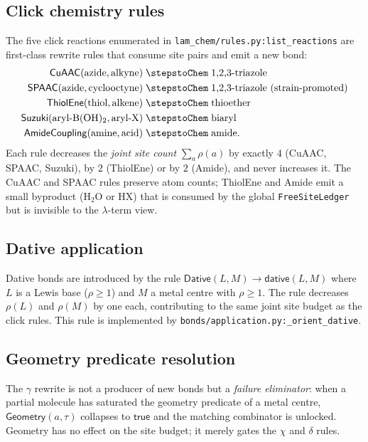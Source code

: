 \subsection{Click chemistry rules}
The five click reactions enumerated in \texttt{lam\_chem/rules.py:list\_reactions}
are first-class rewrite rules that consume site pairs and emit a new bond:
\begin{align*}
  \mathsf{CuAAC}(\text{azide},\text{alkyne})
    &\;\stepstoChem\; \text{1,2,3-triazole} \\
  \mathsf{SPAAC}(\text{azide},\text{cyclooctyne})
    &\;\stepstoChem\; \text{1,2,3-triazole (strain-promoted)} \\
  \mathsf{ThiolEne}(\text{thiol},\text{alkene})
    &\;\stepstoChem\; \text{thioether} \\
  \mathsf{Suzuki}(\text{aryl-B(OH)$_2$},\text{aryl-X})
    &\;\stepstoChem\; \text{biaryl} \\
  \mathsf{AmideCoupling}(\text{amine},\text{acid})
    &\;\stepstoChem\; \text{amide}.
\end{align*}
Each rule decreases the \emph{joint site count}
$\sum_a \rho(a)$ by exactly $4$ (CuAAC, SPAAC, Suzuki), by $2$
(ThiolEne) or by $2$ (Amide), and never increases it. The CuAAC and SPAAC
rules preserve atom counts; ThiolEne and Amide emit a small byproduct
(\ensuremath{\mathrm{H_2O}} or \ensuremath{\mathrm{HX}}) that is consumed by the global
\texttt{FreeSiteLedger} but is invisible to the $\lambda$-term view.

\subsection{Dative application}
Dative bonds are introduced by the rule
$\mathsf{Dative}(L,M) \to \mathsf{dative}(L,M)$ where $L$ is a Lewis base
($\rho \ge 1$) and $M$ a metal centre with $\rho \ge 1$. The rule decreases
$\rho(L)$ and $\rho(M)$ by one each, contributing to the same joint site
budget as the click rules. This rule is implemented by
\texttt{bonds/application.py:\_orient\_dative}.

\subsection{Geometry predicate resolution}
The $\gamma$ rewrite is not a producer of new bonds but a \emph{failure
eliminator}: when a partial molecule has saturated the geometry predicate
of a metal centre, $\mathsf{Geometry}(a,\tau)$ collapses to $\mathsf{true}$
and the matching combinator is unlocked. Geometry has no effect on the site
budget; it merely gates the $\chi$ and $\delta$ rules.

